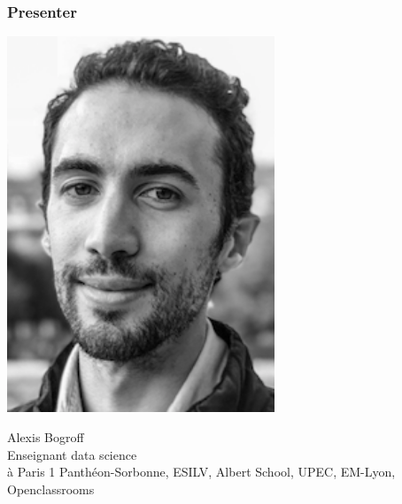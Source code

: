\begin{frame}\frametitle{Presenter}
   \begin{minipage}{0.3\linewidth}
      \centering
      \includegraphics[width=0.6\textwidth]{images/AlexisBogroff.png} \\
   \end{minipage}
   \begin{minipage}{0.6\linewidth}
      \noindent Alexis Bogroff \\
      Enseignant data science \\
      à Paris 1 Panthéon-Sorbonne, ESILV, Albert School, UPEC, EM-Lyon, Openclassrooms
   \end{minipage}
   \\[2ex]
   \hfill
\end{frame}

